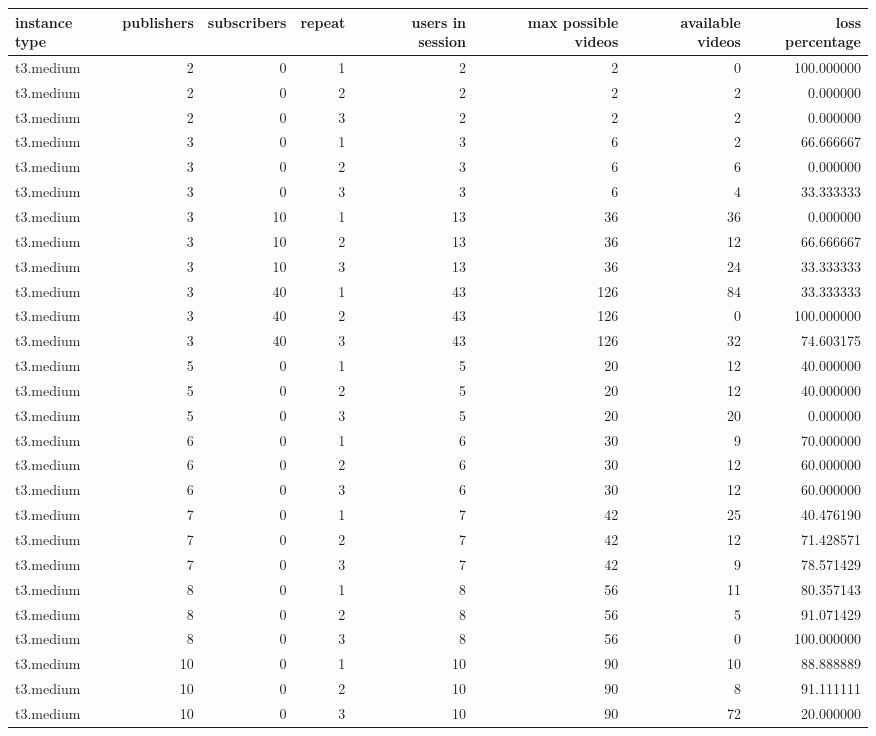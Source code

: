 \begin{tabular}{lrrrrrrr}
\toprule
instance type & publishers & subscribers & repeat & users in session & max possible videos & available videos & loss percentage \\
\midrule
t3.medium & 2 & 0 & 1 & 2 & 2 & 0 & 100.000000 \\
t3.medium & 2 & 0 & 2 & 2 & 2 & 2 & 0.000000 \\
t3.medium & 2 & 0 & 3 & 2 & 2 & 2 & 0.000000 \\
t3.medium & 3 & 0 & 1 & 3 & 6 & 2 & 66.666667 \\
t3.medium & 3 & 0 & 2 & 3 & 6 & 6 & 0.000000 \\
t3.medium & 3 & 0 & 3 & 3 & 6 & 4 & 33.333333 \\
t3.medium & 3 & 10 & 1 & 13 & 36 & 36 & 0.000000 \\
t3.medium & 3 & 10 & 2 & 13 & 36 & 12 & 66.666667 \\
t3.medium & 3 & 10 & 3 & 13 & 36 & 24 & 33.333333 \\
t3.medium & 3 & 40 & 1 & 43 & 126 & 84 & 33.333333 \\
t3.medium & 3 & 40 & 2 & 43 & 126 & 0 & 100.000000 \\
t3.medium & 3 & 40 & 3 & 43 & 126 & 32 & 74.603175 \\
t3.medium & 5 & 0 & 1 & 5 & 20 & 12 & 40.000000 \\
t3.medium & 5 & 0 & 2 & 5 & 20 & 12 & 40.000000 \\
t3.medium & 5 & 0 & 3 & 5 & 20 & 20 & 0.000000 \\
t3.medium & 6 & 0 & 1 & 6 & 30 & 9 & 70.000000 \\
t3.medium & 6 & 0 & 2 & 6 & 30 & 12 & 60.000000 \\
t3.medium & 6 & 0 & 3 & 6 & 30 & 12 & 60.000000 \\
t3.medium & 7 & 0 & 1 & 7 & 42 & 25 & 40.476190 \\
t3.medium & 7 & 0 & 2 & 7 & 42 & 12 & 71.428571 \\
t3.medium & 7 & 0 & 3 & 7 & 42 & 9 & 78.571429 \\
t3.medium & 8 & 0 & 1 & 8 & 56 & 11 & 80.357143 \\
t3.medium & 8 & 0 & 2 & 8 & 56 & 5 & 91.071429 \\
t3.medium & 8 & 0 & 3 & 8 & 56 & 0 & 100.000000 \\
t3.medium & 10 & 0 & 1 & 10 & 90 & 10 & 88.888889 \\
t3.medium & 10 & 0 & 2 & 10 & 90 & 8 & 91.111111 \\
t3.medium & 10 & 0 & 3 & 10 & 90 & 72 & 20.000000 \\
\bottomrule
\end{tabular}
